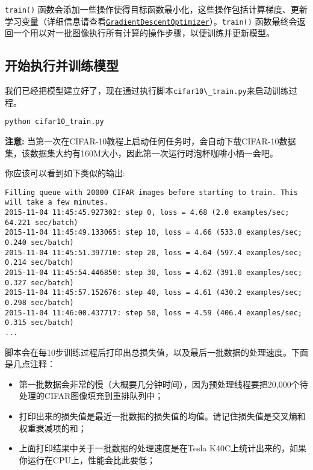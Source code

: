 \lstinline{train()}
函数会添加一些操作使得目标函数最小化，这些操作包括计算梯度、更新学习变量（详细信息请查看\href{tensorflow-zh/SOURCE/api_docs/python/train.md\#GradientDescentOptimizer}{\lstinline{GradientDescentOptimizer}}）。\lstinline{train()}
函数最终会返回一个用以对一批图像执行所有计算的操作步骤，以便训练并更新模型。

\subsection{开始执行并训练模型
}\label{ux5f00ux59cbux6267ux884cux5e76ux8badux7ec3ux6a21ux578b}

我们已经把模型建立好了，现在通过执行脚本\lstinline{cifar10\_train.py}来启动训练过程。

\begin{lstlisting}
python cifar10_train.py
\end{lstlisting}

\textbf{注意:}
当第一次在CIFAR-10教程上启动任何任务时，会自动下载CIFAR-10数据集，该数据集大约有160M大小，因此第一次运行时泡杯咖啡小栖一会吧。

你应该可以看到如下类似的输出:

\begin{lstlisting}
Filling queue with 20000 CIFAR images before starting to train. This will take a few minutes.
2015-11-04 11:45:45.927302: step 0, loss = 4.68 (2.0 examples/sec; 64.221 sec/batch)
2015-11-04 11:45:49.133065: step 10, loss = 4.66 (533.8 examples/sec; 0.240 sec/batch)
2015-11-04 11:45:51.397710: step 20, loss = 4.64 (597.4 examples/sec; 0.214 sec/batch)
2015-11-04 11:45:54.446850: step 30, loss = 4.62 (391.0 examples/sec; 0.327 sec/batch)
2015-11-04 11:45:57.152676: step 40, loss = 4.61 (430.2 examples/sec; 0.298 sec/batch)
2015-11-04 11:46:00.437717: step 50, loss = 4.59 (406.4 examples/sec; 0.315 sec/batch)
...
\end{lstlisting}

脚本会在每10步训练过程后打印出总损失值，以及最后一批数据的处理速度。下面是几点注释：

\begin{itemize}
\item
  第一批数据会非常的慢（大概要几分钟时间），因为预处理线程要把20,000个待处理的CIFAR图像填充到重排队列中；
\item
  打印出来的损失值是最近一批数据的损失值的均值。请记住损失值是交叉熵和权重衰减项的和；
\item
  上面打印结果中关于一批数据的处理速度是在Tesla
  K40C上统计出来的，如果你运行在CPU上，性能会比此要低；
\end{itemize}

